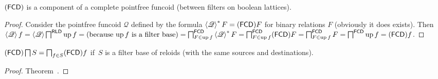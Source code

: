 \begin{thm}
  $(\mathsf{FCD})$ is a component of a complete pointfree funcoid
  (between filters on boolean lattices).
\end{thm}

\begin{proof}
  Consider the pointfree funcoid $\mathscr{Q}$ defined by the formula
  $\left\langle \mathscr{Q} \right\rangle^{\ast} F = (\mathsf{FCD}) F$
  for binary relations $F$ (obviously it does exists). Then $\left\langle
  \mathscr{Q} \right\rangle f = \left\langle \mathscr{Q} \right\rangle
  \bigsqcap^{\mathsf{RLD}} \operatorname{up} f = \text{(because $\operatorname{up} f$
  is a filter base)} = \bigsqcap^{\mathsf{FCD}}_{F \in \operatorname{up} f}
  \left\langle \mathscr{Q} \right\rangle^{\ast} F =
  \bigsqcap^{\mathsf{FCD}}_{F \in \operatorname{up} f} (\mathsf{FCD}) F
  = \bigsqcap^{\mathsf{FCD}}_{F \in \operatorname{up} f} F =
  \bigsqcap^{\mathsf{FCD}} \operatorname{up} f = (\mathsf{FCD}) f$.
\end{proof}

\begin{prop}
$(\mathsf{FCD}) \bigsqcap S = \bigsqcap_{f\in S}(\mathsf{FCD}) f$ if~$S$ is
a filter base of reloids (with the same sources and destinations).
\end{prop}

\begin{proof}
Theorem~.
\end{proof}
